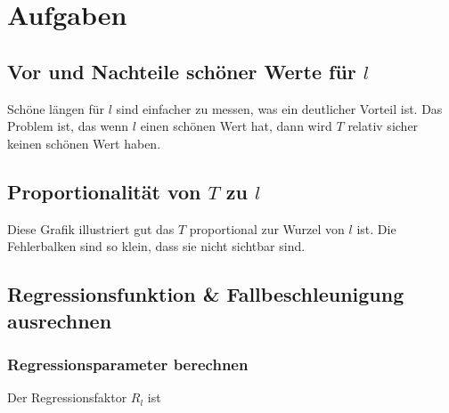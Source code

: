 \documentclass[12pt, a4paper, twoside]{article}
\begin{document}
\section{Aufgaben}
\subsection{Vor und Nachteile schöner Werte für $l$}
Schöne längen für $l$ sind einfacher zu messen, was ein deutlicher Vorteil ist.
Das Problem ist, das wenn $l$ einen schönen Wert hat, dann wird $T$ relativ sicher keinen schönen Wert haben.

\subsection{Proportionalität von $T$ zu $l$}

\begin{center}
\end{center}


Diese Grafik illustriert gut das $T$ proportional zur Wurzel von $l$ ist.
Die Fehlerbalken sind so klein, dass sie nicht sichtbar sind.

\subsection{Regressionsfunktion \& Fallbeschleunigung ausrechnen}
\subsubsection{Regressionsparameter berechnen}
Der Regressionsfaktor $R_l$ ist
\end{document}

